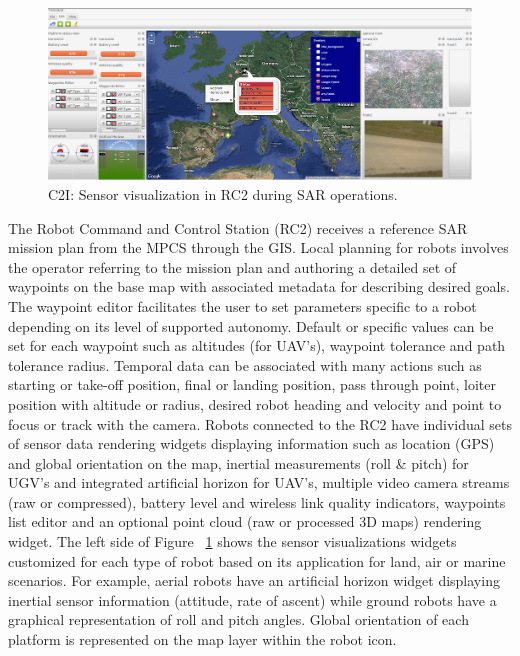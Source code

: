 \documentclass{article}
\begin{document}
\begin{figure} [h]
    \centering
    \includegraphics[width=\textwidth]{ROB-15-0035_fig7.png}
    \caption{C2I: Sensor visualization in RC2 during SAR operations.}
    \label{fig:c2i_rc2_viz}
\end{figure}

The Robot Command and Control Station (RC2) receives a reference SAR mission plan from the MPCS through the GIS. Local planning for robots involves the operator referring to the mission plan and authoring a detailed set of waypoints on the base map with associated metadata for describing desired goals.
The waypoint editor facilitates the user to set parameters specific to a robot depending on its level of supported autonomy.
Default or specific values can be set for each waypoint such as altitudes (for UAV's), waypoint tolerance and path tolerance radius.
Temporal data can be associated with many actions such as starting or take-off position, final or landing position, pass through point, loiter position with altitude or radius, desired robot heading and velocity and point to focus or track with the camera.
Robots connected to the RC2 have individual sets of sensor data rendering widgets displaying information such as location (GPS) and global orientation on the map, inertial measurements (roll \& pitch) for UGV’s and integrated artificial horizon for UAV’s, multiple video camera streams (raw or compressed), battery level and wireless link quality indicators, waypoints list editor and an optional point cloud (raw or processed 3D maps) rendering widget. The left side of Figure ~\ref{fig:c2i_rc2_viz} shows the sensor visualizations widgets customized for each type of robot based on its application for land, air or marine scenarios. For example, aerial robots have an artificial horizon widget displaying inertial sensor information (attitude, rate of ascent) while ground robots have a graphical representation of roll and pitch angles. Global orientation of each platform is represented on the map layer within the robot icon.
\end{document}
